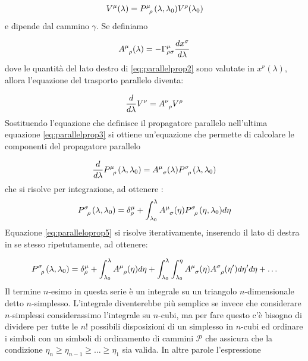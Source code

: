 \documentclass[twoside]{article}
\begin{document}
\begin{equation}
	V^{\mu}(\lambda) = P\indices{^\mu _\rho}(\lambda,\lambda_0)V^{\rho}(\lambda_0)
\end{equation}
e dipende dal cammino $\gamma$. Se definiamo

\begin{equation}\label{eq:parallelprop2}
	A\indices{^\mu_\rho}(\lambda) = -\Gamma^{\mu}_{\rho \sigma}\frac{dx^\sigma}{d\lambda}
\end{equation}
dove le quantità del lato destro di \ref{eq:parallelprop2} sono valutate in $x^\nu(\lambda)$, allora l'equazione del trasporto parallelo diventa:

\begin{equation}\label{eq:parallelprop3}
	\frac{d}{d\lambda}V^{\nu} = A\indices{^\nu_\rho}V^{\rho}
\end{equation}
Sostituendo l'equazione che definisce il propagatore parallelo nell'ultima equazione
\ref{eq:parallelprop3} si ottiene un'equazione che permette di calcolare le componenti del propagatore parallelo 

\begin{equation}
\frac{d}{d\lambda}P\indices{^\mu_\rho}(\lambda,\lambda_0) = A\indices{^\mu_\sigma}(\lambda)P\indices{^\sigma_\rho}(\lambda,\lambda_0)
\end{equation}
che si risolve per integrazione, ad ottenere :
\begin{equation}\label{eq:paralleloprop5}
	P\indices{^\sigma_\rho}(\lambda,\lambda_0) = \delta_\rho^\mu + \int_{\lambda_0}^\lambda A\indices{^\mu_\sigma}(\eta)P\indices{^\sigma_\rho}(\eta,\lambda_0)d\eta
\end{equation}
Equazione \ref{eq:paralleloprop5} si risolve iterativamente, inserendo il lato di destra in se stesso ripetutamente, ad ottenere:

\begin{equation}\label{eq:paralleloprop6}
	P\indices{^\sigma_\rho}(\lambda,\lambda_0) = \delta_\rho^\mu + \int_{\lambda_0}^\lambda A\indices{^\mu_\rho}(\eta) d\eta 
	+ \int_{\lambda_0}^{\lambda} \int_{\lambda_0}^{\eta} A\indices{^\mu_\sigma}(\eta) A\indices{^\sigma_\rho}(\eta')d\eta' d\eta + \ldots
\end{equation}
Il termine $n$-esimo in questa serie è un integrale su un triangolo $n$-dimensionale detto $n$-simplesso.
L'integrale diventerebbe più semplice se invece che considerare $n$-simplessi considerassimo l'integrale su $n$-cubi, ma per fare questo c'è bisogno di dividere per tutte le $n!$ possibili disposizioni di un simplesso in $n$-cubi ed ordinare i simboli con un simboli di ordinamento di cammini $\mathcal{P}$ che assicura che la condizione $\eta_n\geq \eta_{n-1} \geq \ldots \geq \eta_1$ sia valida. In altre parole l'espressione 
\end{document}
